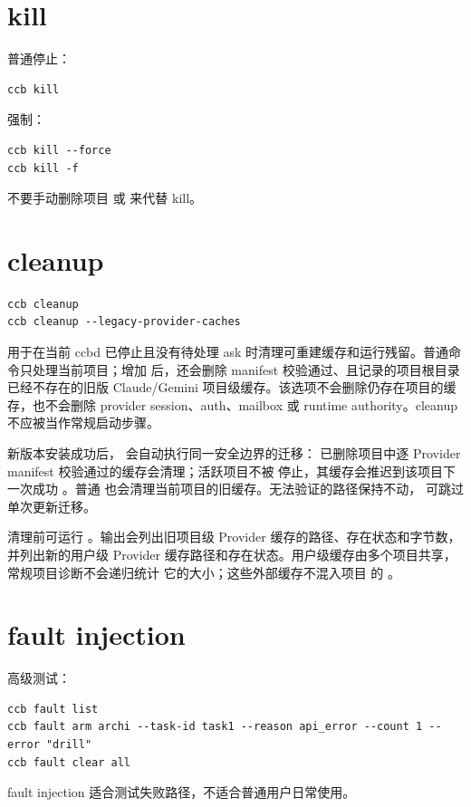 \section{kill}

普通停止：

\begin{lstlisting}
ccb kill
\end{lstlisting}

强制：

\begin{lstlisting}
ccb kill --force
ccb kill -f
\end{lstlisting}

不要手动删除项目  或  来代替 kill。

\section{cleanup}

\begin{lstlisting}
ccb cleanup
ccb cleanup --legacy-provider-caches
\end{lstlisting}

用于在当前 ccbd 已停止且没有待处理 ask 时清理可重建缓存和运行残留。普通命令只处理当前项目；增加
 后，还会删除 manifest 校验通过、且记录的项目根目录已经不存在的旧版
Claude/Gemini 项目级缓存。该选项不会删除仍存在项目的缓存，也不会删除 provider session、auth、mailbox
或 runtime authority。cleanup 不应被当作常规启动步骤。

新版本安装成功后， 会自动执行同一安全边界的迁移：
已删除项目中逐 Provider manifest 校验通过的缓存会清理；活跃项目不被
停止，其缓存会推迟到该项目下一次成功 。普通
 也会清理当前项目的旧缓存。无法验证的路径保持不动，
 可跳过单次更新迁移。

清理前可运行 。输出会列出旧项目级 Provider 缓存的路径、存在状态和字节数，
并列出新的用户级 Provider 缓存路径和存在状态。用户级缓存由多个项目共享，常规项目诊断不会递归统计
它的大小；这些外部缓存不混入项目  的 。

\section{fault injection}

高级测试：

\begin{lstlisting}
ccb fault list
ccb fault arm archi --task-id task1 --reason api_error --count 1 --error "drill"
ccb fault clear all
\end{lstlisting}

fault injection 适合测试失败路径，不适合普通用户日常使用。
